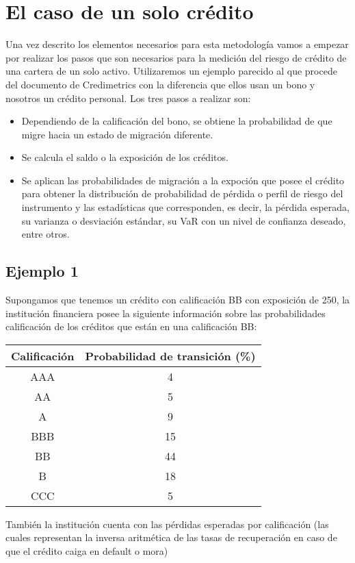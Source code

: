 \documentclass[
  12pt,
]{krantz}
\theoremstyle{definition}
\theoremstyle{definition}
\theoremstyle{definition}
\theoremstyle{remark}
\begin{document}
\hypertarget{el-caso-de-un-solo-credito}{%
\section{El caso de un solo crédito}\label{el-caso-de-un-solo-credito}}

Una vez descrito los elementos necesarios para esta metodología vamos a empezar por realizar los pasos que son necesarios para la medición del riesgo de crédito de una cartera de un solo activo. Utilizaremos un ejemplo parecido al que procede del documento de Credimetrics con la diferencia que ellos usan un bono y nosotros un crédito personal. Los tres pasos a realizar son:

\begin{itemize}
\item
  Dependiendo de la calificación del bono, se obtiene la probabilidad de que migre hacia un estado de migración diferente.
\item
  Se calcula el saldo o la exposición de los créditos.
\item
  Se aplican las probabilidades de migración a la expoción que posee el crédito para obtener la distribución de probabilidad de pérdida o perfil de riesgo del instrumento y las estadísticas que corresponden, es decir, la pérdida esperada, su varianza o desviación estándar, su VaR con un nivel de confianza deseado, entre otros.
\end{itemize}

\hypertarget{ejemplo-1}{%
\subsection{Ejemplo 1}\label{ejemplo-1}}

Supongamos que tenemos un crédito con calificación BB con exposición de 250, la institución financiera posee la siguiente información sobre las probabilidades calificación de los créditos que están en una calificación BB:

\begin{longtable}[]{@{}cc@{}}
\toprule
Calificación & Probabilidad de transición (\%)\tabularnewline
\midrule
\endhead
AAA & 4\tabularnewline
AA & 5\tabularnewline
A & 9\tabularnewline
BBB & 15\tabularnewline
BB & 44\tabularnewline
B & 18\tabularnewline
CCC & 5\tabularnewline
\bottomrule
\end{longtable}

También la institución cuenta con las pérdidas esperadas por calificación (las cuales representan la inversa aritmética de las tasas de recuperación en caso de que el crédito caiga en default o mora)
\end{document}
